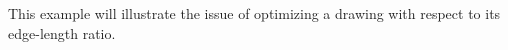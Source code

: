 This example will illustrate the issue of optimizing a drawing with respect to its edge-length ratio. 
 

